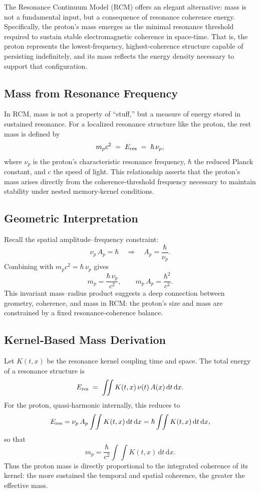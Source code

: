 The Resonance Continuum Model (RCM) offers an elegant alternative: mass is not a fundamental input, but a consequence of resonance coherence energy. Specifically, the proton’s mass emerges as the minimal resonance threshold required to sustain stable electromagnetic coherence in space‐time. That is, the proton represents the lowest‐frequency, highest‐coherence structure capable of persisting indefinitely, and its mass reflects the energy density necessary to support that configuration.

\subsection{Mass from Resonance Frequency}
In RCM, mass is not a property of “stuff,” but a measure of energy stored in sustained resonance. For a localized resonance structure like the proton, the rest mass is defined by
\[
m_p c^2 \;=\; E_{\rm res} \;=\; \hbar\,\nu_p,
\]
where \(\nu_p\) is the proton’s characteristic resonance frequency, \(\hbar\) the reduced Planck constant, and \(c\) the speed of light. This relationship asserts that the proton’s mass arises directly from the coherence‐threshold frequency necessary to maintain stability under nested memory‐kernel conditions.

\subsection{Geometric Interpretation}
Recall the spatial amplitude–frequency constraint:
\[
\nu_p\,A_p = \hbar
\quad\Longrightarrow\quad
A_p = \frac{\hbar}{\nu_p}.
\]
Combining with \(m_p c^2 = \hbar\,\nu_p\) gives
\[
m_p = \frac{\hbar\,\nu_p}{c^2},
\qquad
m_p\,A_p = \frac{\hbar^2}{c^2}.
\]
This invariant mass–radius product suggests a deep connection between geometry, coherence, and mass in RCM: the proton’s size and mass are constrained by a fixed resonance‐coherence balance.

\subsection{Kernel‐Based Mass Derivation}
Let \(K(t,x)\) be the resonance kernel coupling time and space. The total energy of a resonance structure is
\[
E_{\rm res} \;=\;\iint K(t,x)\,\nu(t)\,A(x)\,\mathrm{d}t\,\mathrm{d}x.
\]
For the proton, quasi‐harmonic internally, this reduces to
\[
E_{\rm res} = \nu_p\,A_p \int\!\!\int K(t,x)\,\mathrm{d}t\,\mathrm{d}x
= \hbar \int\!\!\int K(t,x)\,\mathrm{d}t\,\mathrm{d}x,
\]
so that
\[
m_p = \frac{\hbar}{c^2} \int\!\!\int K(t,x)\,\mathrm{d}t\,\mathrm{d}x.
\]
Thus the proton mass is directly proportional to the integrated coherence of its kernel: the more sustained the temporal and spatial coherence, the greater the effective mass.

